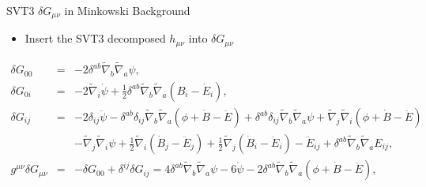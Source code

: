 \documentclass[8pt]{beamer}
\begin{document}

\begin{frame}{SVT3 $\delta G_{\mu\nu}$ in Minkowski Background}
	\begin{itemize}
		\item Insert the SVT3 decomposed $h_{\mu\nu}$ into $\delta G_{\mu\nu}$
	\end{itemize}
	\begin{eqnarray*}
	\delta G_{00}&=&- 2 \delta^{ab} \tilde{\nabla}_{b}\tilde{\nabla}_{a}\psi,
	\nonumber\\
	\delta G_{0i}&=&- 2 \tilde{\nabla}_{i}\dot{\psi}+ \tfrac{1}{2} \delta^{ab} \tilde{\nabla}_{b}\tilde{\nabla}_{a}(B_{i} -  \dot{E}_{i}),
	\nonumber\\
	\delta G_{ij}&=&- 2 \delta_{ij} \ddot{\psi} -  \delta^{ab} \delta_{ij} \tilde{\nabla}_{b}\tilde{\nabla}_{a}(\phi+\dot{B}  -\ddot{E})+ \delta^{ab} \delta_{ij} \tilde{\nabla}_{b}\tilde{\nabla}_{a}\psi 
	+ \tilde{\nabla}_{j}\tilde{\nabla}_{i}(\phi+\dot{B} -  \ddot{E}) 
	\nonumber\\
	&&-  \tilde{\nabla}_{j}\tilde{\nabla}_{i}\psi
	+ \tfrac{1}{2} \tilde{\nabla}_{i}(\dot{B}_{j} - \ddot{E}_{j}) + \tfrac{1}{2} \tilde{\nabla}_{j}(\dot{B}_{i}  
	- \ddot{E}_{i})- \ddot{E}_{ij} + \delta^{ab} \tilde{\nabla}_{b}\tilde{\nabla}_{a}E_{ij},
	\nonumber\\
	g^{\mu\nu}\delta G_{\mu\nu}&=&-\delta G_{00}+\delta^{ij}\delta G_{ij}=4 \delta^{ab} \tilde{\nabla}_{b}\tilde{\nabla}_{a}\psi -6\ddot{\psi}-2 \delta^{ab} \tilde{\nabla}_{b}\tilde{\nabla}_{a}(\phi+\dot{B}  -\ddot{E}),
	\label{2.3}
	\end{eqnarray*}
\end{frame}


\begin{frame}{}
	
\end{frame}

\begin{frame}{}
	
\end{frame}

\begin{frame}{}
	
\end{frame}

\begin{frame}{}
	
\end{frame}
\end{document}
